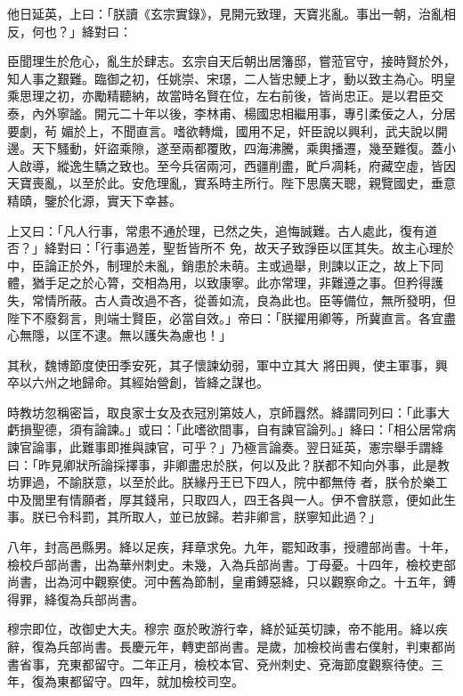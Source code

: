 \begin{pinyinscope}
 他日延英，上曰：「朕讀《玄宗實錄》，見開元致理，天寶兆亂。事出一朝，治亂相反，何也？」絳對曰：



 臣聞理生於危心，亂生於肆志。玄宗自天后朝出居籓邸，嘗蒞官守，接時賢於外，知人事之艱難。臨御之初，任姚崇、宋璟，二人皆忠鯁上才，動以致主為心。明皇乘思理之初，亦勵精聽納，故當時名賢在位，左右前後，皆尚忠正。是以君臣交泰，內外寧謐。開元二十年以後，李林甫、楊國忠相繼用事，專引柔佞之人，分居要劇，茍
 媚於上，不聞直言。嗜欲轉熾，國用不足，奸臣說以興利，武夫說以開邊。天下騷動，奸盜乘隙，遂至兩都覆敗，四海沸騰，乘輿播遷，幾至難復。蓋小人啟導，縱逸生驕之致也。至今兵宿兩河，西疆削盡，甿戶凋耗，府藏空虛，皆因天寶喪亂，以至於此。安危理亂，實系時主所行。陛下思廣天聰，親覽國史，垂意精賾，鑒於化源，實天下幸甚。



 上又曰：「凡人行事，常患不通於理，已然之失，追悔誠難。古人處此，復有道否？」絳對曰：「行事過差，聖哲皆所不
 免，故天子致諍臣以匡其失。故主心理於中，臣論正於外，制理於未亂，銷患於未萌。主或過舉，則諫以正之，故上下同體，猶手足之於心膂，交相為用，以致康寧。此亦常理，非難遵之事。但矜得護失，常情所蔽。古人貴改過不吝，從善如流，良為此也。臣等備位，無所發明，但陛下不廢芻言，則端士賢臣，必當自效。」帝曰：「朕擢用卿等，所冀直言。各宜盡心無隱，以匡不逮。無以護失為慮也！」



 其秋，魏博節度使田季安死，其子懷諫幼弱，軍中立其大
 將田興，使主軍事，興卒以六州之地歸命。其經始營創，皆絳之謀也。



 時教坊忽稱密旨，取良家士女及衣冠別第妓人，京師囂然。絳謂同列曰：「此事大虧損聖德，須有論諫。」或曰：「此嗜欲間事，自有諫官論列。」絳曰：「相公居常病諫官論事，此難事即推與諫官，可乎？」乃極言論奏。翌日延英，憲宗舉手謂絳曰：「昨見卿狀所論採擇事，非卿盡忠於朕，何以及此？朕都不知向外事，此是教坊罪過，不諭朕意，以至於此。朕緣丹王已下四人，院中都無侍
 者，朕令於樂工中及閭里有情願者，厚其錢帛，只取四人，四王各與一人。伊不會朕意，便如此生事。朕已令科罰，其所取人，並已放歸。若非卿言，朕寧知此過？」



 八年，封高邑縣男。絳以足疾，拜章求免。九年，罷知政事，授禮部尚書。十年，檢校戶部尚書，出為華州刺史。未幾，入為兵部尚書。丁母憂。十四年，檢校吏部尚書，出為河中觀察使。河中舊為節制，皇甫鎛惡絳，只以觀察命之。十五年，鎛得罪，絳復為兵部尚書。



 穆宗即位，改御史大夫。穆宗
 亟於畋游行幸，絳於延英切諫，帝不能用。絳以疾辭，復為兵部尚書。長慶元年，轉吏部尚書。是歲，加檢校尚書右僕射，判東都尚書省事，充東都留守。二年正月，檢校本官、兗州刺史、兗海節度觀察待使。三年，復為東都留守。四年，就加檢校司空。




\end{pinyinscope}
